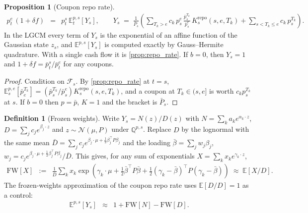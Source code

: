 \documentclass[11pt,english]{amsart}
\newcommand{\EE}{\mathbb{E}}
\newcommand{\QQ}{\mathbb{Q}}
\theoremstyle{definition}
\newtheorem{prop}{Proposition}
\newtheorem{defi}{Definition}
\begin{document}
\begin{prop}[Coupon repo rate]\label{prop:repo_coupon}
\begin{eqnarray}
	p^e_t\,(1+\delta f) &=& p^s_t\,\EE^{p,s}_t[Y_s], \qquad
	Y_s \;=\; \frac{1}{\bar P_s}\left( \sum_{T_k>e} c_k\, p^e_s\,\frac{\bar p^{T_k}_s}{\bar p^e_s}\,K^{\mathrm{repo}}_s(s,e,T_k) + \sum_{s<T_k\le e} c_k\, p^{T_k}_s \right).
\end{eqnarray}
In the LGCM every term of $Y_s$ is the exponential of an affine function of the Gaussian state $z_s$, and $\EE^{p,s}[Y_s]$ is computed exactly by Gauss--Hermite quadrature. With a single cash flow it is \autoref{prop:repo_rate}. If $b = 0$, then $Y_s = 1$ and $1+\delta f = \bar p^s_t/\bar p^e_t$ for any coupons.
\end{prop}

\begin{proof}
Condition on $\mathcal F_s$. By \autoref{prop:repo_rate} at $t = s$, $\EE^{p,e}_s[\bar p^{T_k}_e] = (\bar p^{T_k}_s/\bar p^e_s)K^{\mathrm{repo}}_s(s,e,T_k)$, and a coupon at $T_k\in(s,e]$ is worth $c_k p^{T_k}_s$ at $s$. If $b = 0$ then $p = \bar p$, $K = 1$ and the bracket is $\bar P_s$.
\end{proof}

\begin{defi}[Frozen weights]\label{defi:repo_frozen}
Write $Y_s = N(z)/D(z)$ with $N = \sum_k a_k e^{\alpha_k\cdot z}$, $D = \sum_j c_j e^{\beta_j\cdot z}$ and $z\sim\mathcal N(\mu, P)$ under $\QQ^{p,s}$. Replace $D$ by the lognormal with the same mean $\bar D = \sum_j c_j e^{\beta_j\cdot\mu + \frac12\beta_j^\top P\beta_j}$ and the loading $\bar\beta = \sum_j w_j\beta_j$, $w_j = c_j e^{\beta_j\cdot\mu + \frac12\beta_j^\top P\beta_j}/\bar D$. This gives, for any sum of exponentials $X = \sum_k x_k e^{\gamma_k\cdot z}$,
\begin{eqnarray}
	\mathrm{FW}[X] &:=& \frac{1}{\bar D}\sum_k x_k \exp\left(\gamma_k\cdot\mu + \tfrac12\bar\beta^\top P\bar\beta + \tfrac12(\gamma_k-\bar\beta)^\top P(\gamma_k-\bar\beta)\right) \;\approx\; \EE\left[X/D\right] .
\end{eqnarray}
The frozen-weights approximation of the coupon repo rate uses $\EE[D/D] = 1$ as a control:
\begin{eqnarray}
	\EE^{p,s}[Y_s] &\approx& 1 + \mathrm{FW}[N] - \mathrm{FW}[D] .
\end{eqnarray}
\end{defi}
\end{document}

